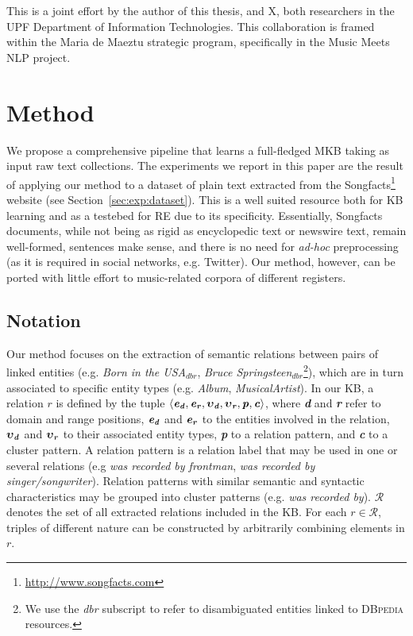 This is a joint effort by the author of this thesis, and X, both researchers in the UPF Department of Information Technologies. This collaboration is framed within the Maria de Maeztu strategic program, specifically in the Music Meets NLP project.


\section{Method}
\label{sec:method}

We propose a comprehensive pipeline that learns a full-fledged \textsc{MKB} taking as input raw text collections. The experiments we report in this paper are the result of applying our method to a dataset of plain text extracted from the Songfacts\footnote{\url{http://www.songfacts.com}} website (see Section~\ref{sec:exp:dataset}). This is a well suited resource both for \textsc{KB} learning and as a testebed for \textsc{RE} due to its specificity. Essentially, Songfacts documents, while not being as rigid as encyclopedic text or newswire text, remain well-formed, sentences make sense, and there is no need for \textit{ad-hoc} preprocessing (as it is required in social networks, e.g. Twitter). Our method, however, can be ported with little effort to music-related corpora of different registers.

\subsection{Notation}

Our method focuses on the extraction of semantic relations between pairs of  linked entities (e.g. \textit{Born in the USA}$_{dbr}$, \textit{Bruce Springsteen}$_{dbr}$\footnote{We use the \textit{dbr} subscript to refer to disambiguated entities linked to \textsc{DBpedia} resources.}), which are in turn associated to specific entity types (e.g. \textit{Album}, \textit{MusicalArtist}). In our \textsc{KB}, a relation $r$ is defined by the tuple $\langle \textbf{\textit{e}}{_\textbf{\textit{d}}},
\textbf{\textit{e}}{_\textbf{\textit{r}}},
\boldsymbol\upsilon{_\textbf{\textit{d}}},
\boldsymbol\upsilon{_\textbf{\textit{r}}},
\textbf{\textit{p}}, \textbf{\textit{c}}\rangle$, where \textbf{\textit{d}} and \textbf{\textit{r}} refer to domain and range positions, $\textbf{\textit{e}}{_\textbf{\textit{d}}}$ and $\textbf{\textit{e}}{_\textbf{\textit{r}}}$ to the entities involved in the relation, $\boldsymbol\upsilon{_\textbf{\textit{d}}}$ and
$\boldsymbol\upsilon{_\textbf{\textit{r}}}$ to their associated entity types, \textbf{\textit{p}} to a relation pattern, and \textbf{\textit{c}} to a cluster pattern.  
A relation pattern is a relation label that may be used in one or several relations (e.g \textit{was recorded by frontman}, \textit{was recorded by singer/songwriter}). Relation patterns with similar semantic and syntactic characteristics may be grouped into cluster patterns (e.g. \textit{was recorded by}). 
$\mathcal{R}$ denotes the set of all extracted relations included in the \textsc{KB}.
For each $r \in \mathcal{R}$, triples of different nature can be constructed by arbitrarily combining elements in $r$.

